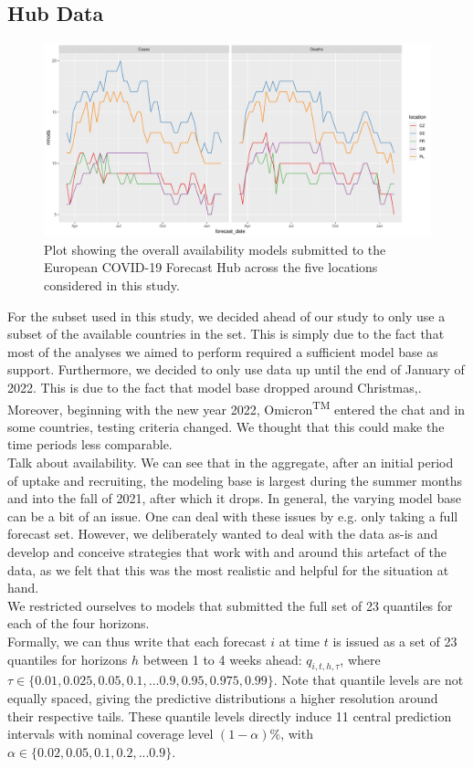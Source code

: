 \subsection{Hub Data}
\begin{figure}
\includegraphics[width = \textwidth]{../plots/availability_all.pdf}
\caption{Plot showing the overall availability models submitted to the European COVID-19 Forecast Hub across the five locations considered in this study.}
\end{figure}
For the subset used in this study, we decided ahead of our study to only use a subset of the available countries in the set. This is simply due to the fact that most of the analyses we aimed to perform required a sufficient model base as support. Furthermore, we decided to only use data up until the end of January of 2022. This is due to the fact that model base dropped around Christmas,. Moreover, beginning with the new year 2022, Omicron\textsuperscript{TM} entered the chat and in some countries, testing criteria changed. We thought that this could make the time periods less comparable.\\
Talk about availability. We can see that in the aggregate, after an initial period of uptake and recruiting, the modeling base is largest during the summer months and into the fall of 2021, after which it drops.
In general, the varying model base can be a bit of an issue. One can deal with these issues by e.g. only taking a full forecast set. However, we deliberately wanted to deal with the data as-is and develop and conceive strategies that work with and around this artefact of the data, as we felt that this was the most realistic and helpful for the situation at hand. \\
We restricted ourselves to models that submitted the full set of 23 quantiles for each of the four horizons.\\
Formally, we can thus write that each forecast $i$ at time $t$ is issued as a set of 23 quantiles for horizons $h$ between 1 to 4 weeks ahead: $q_{i, t, h, \tau}$, where $\tau \in \{0.01, 0.025, 0.05, 0.1, ... 0.9, 0.95, 0.975, 0.99\} $. Note that quantile levels are not equally spaced, giving the predictive distributions a higher resolution around their respective tails. These quantile levels directly induce 11 central prediction intervals with nominal coverage level $(1-\alpha)\%$, with $\alpha \in \{0.02, 0.05, 0.1, 0.2, ... 0.9\}$.\\

